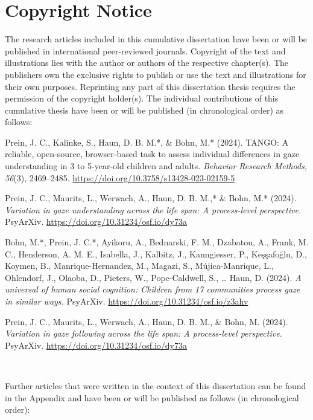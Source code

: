 \documentclass[
]{scrbook}
\begin{document}
\tableofcontents

\chapter*{Copyright Notice}\label{copyright-notice}

The research articles included in this cumulative dissertation have been or will be published in international peer-reviewed journals. Copyright of the text and illustrations lies with the author or authors of the respective chapter(s). The publishers own the exclusive rights to publish or use the text and illustrations for their own purposes. Reprinting any part of this dissertation thesis requires the permission of the copyright holder(s).
The individual contributions of this cumulative thesis have been or will be published (in chronological order) as follows:

Prein, J. C., Kalinke, S., Haun, D. B. M.*, \& Bohn, M.* (2024). TANGO: A reliable, open-source, browser-based task to assess individual differences in gaze understanding in 3 to 5-year-old children and adults. \emph{Behavior Research Methods, 56}(3), 2469--2485. \url{https://doi.org/10.3758/s13428-023-02159-5}

Prein, J. C., Maurits, L., Werwach, A., Haun, D. B. M.,* \& Bohn, M.* (2024). \emph{Variation in gaze understanding across the life span: A process-level perspective.} PsyArXiv. \url{https://doi.org/10.31234/osf.io/dy73a}

Bohn, M.*, Prein, J. C.*, Ayikoru, A., Bednarski, F. M., Dzabatou, A., Frank, M. C., Henderson, A. M. E., Isabella, J., Kalbitz, J., Kanngiesser, P., Keşşafoğlu, D., Koymen, B., Manrique-Hernandez, M., Magazi, S., Mújica-Manrique, L., Ohlendorf, J., Olaoba, D., Pieters, W., Pope-Caldwell, S., \ldots{} Haun, D. (2024). \emph{A universal of human social cognition: Children from 17 communities process gaze in similar ways.} PsyArXiv. \url{https://doi.org/10.31234/osf.io/z3ahv}

Prein, J. C., Maurits, L., Werwach, A., Haun, D. B. M., \& Bohn, M. (2024). \emph{Variation in gaze following across the life span: A process-level perspective.} PsyArXiv. \url{https://doi.org/10.31234/osf.io/dy73a}

~

Further articles that were written in the context of this dissertation can be found in the Appendix and have been or will be published as follows (in chronological order):
\end{document}
